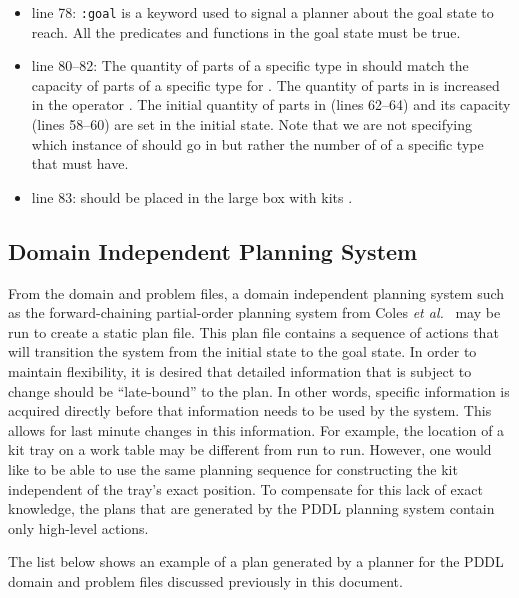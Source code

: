 \begin{itemize}
\item line 78: \texttt{:goal} is a keyword used to signal a planner about the goal state to reach. All the predicates and functions in the goal state must be true.
\item line 80--82: The quantity of parts of a specific type in  should match the capacity of parts of a specific type for . The quantity of parts in  is increased in the operator . The initial quantity of parts in  (lines 62--64) and its capacity (lines 58--60) are set in the initial state. Note that we are not specifying which instance of  should go in  but rather the number of  of a specific type that  must have.
\item line 83:  should be placed in the large box with kits .
\end{itemize}

\subsection{Domain Independent Planning System}
From the domain and problem files, a domain independent planning system such as the forward-chaining partial-order planning system from Coles \textit{et al.}~\cite{Coles.ICAPS.2010} may be run to create a static plan file. This plan file contains a sequence of actions that will transition the system from the initial state to the goal state. In order to maintain flexibility, it is desired that detailed information that is subject to change should be ``late-bound'' to the plan. In other words, specific information is acquired directly before that information needs to be used by the system. This allows for last minute changes in this information. For example, the location of a kit tray on a work table may be different from run to run. However, one would like to be able to use the same planning sequence for constructing the kit independent of the tray's exact position.
To compensate for this lack of exact knowledge, the plans that are generated by the PDDL planning system contain only high-level actions.

The list below shows an example of a plan generated by a planner for the PDDL domain and problem files discussed previously in this document.

